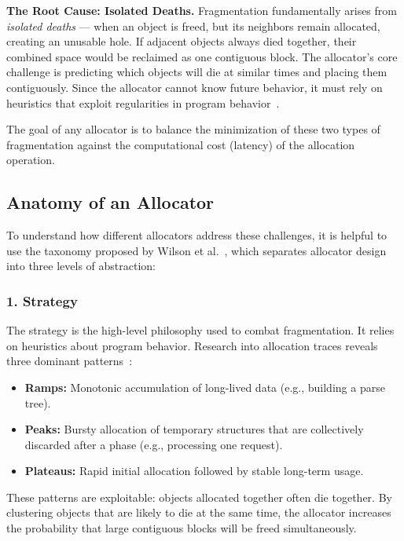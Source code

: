 \documentclass[a4paper,10pt,twoside]{report}
\theoremstyle{definition}
\begin{document}
\textbf{The Root Cause: Isolated Deaths.} Fragmentation fundamentally arises from \textit{isolated deaths} --- when an object is freed, but its neighbors remain allocated, creating an unusable hole. If adjacent objects always died together, their combined space would be reclaimed as one contiguous block. The allocator's core challenge is predicting which objects will die at similar times and placing them contiguously. Since the allocator cannot know future behavior, it must rely on heuristics that exploit regularities in program behavior~\cite{wilson1995survey}.

The goal of any allocator is to balance the minimization of these two types of fragmentation against the computational cost (latency) of the allocation operation.

\subsection{Anatomy of an Allocator}

To understand how different allocators address these challenges, it is helpful to use the taxonomy proposed by Wilson et al.~\cite{wilson1995survey}, which separates allocator design into three levels of abstraction:

\subsubsection{1. Strategy}
The strategy is the high-level philosophy used to combat fragmentation. It relies on heuristics about program behavior. Research into allocation traces reveals three dominant patterns~\cite{wilson1995survey}:

\begin{itemize}
    \item \textbf{Ramps:} Monotonic accumulation of long-lived data (e.g., building a parse tree).
    \item \textbf{Peaks:} Bursty allocation of temporary structures that are collectively discarded after a phase (e.g., processing one request).
    \item \textbf{Plateaus:} Rapid initial allocation followed by stable long-term usage.
\end{itemize}

These patterns are exploitable: objects allocated together often die together. By clustering objects that are likely to die at the same time, the allocator increases the probability that large contiguous blocks will be freed simultaneously.
\end{document}
